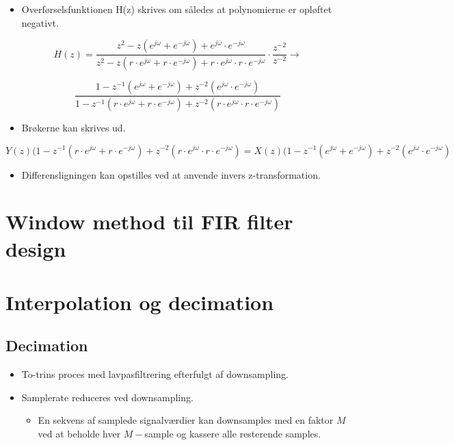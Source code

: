 \documentclass[danish]{article}
\begin{document}
\begin{itemize}
	\item Overførselsfunktionen H(z) skrives om således at polynomierne er opløftet negativt.
\end{itemize}

\begin{equation}
H(z) = \frac{z^2 - z(e^{j\omega}+e^{-j\omega}) + e^{j\omega}\cdot e^{-j\omega}}{z^2 - z(r\cdot e^{j\omega}+r\cdot e^{-j\omega}) + r\cdot e^{j\omega}\cdot r\cdot e^{-j\omega}} \cdot \frac{z^{-2}}{z^{-2}} \longrightarrow 
\end{equation}

\begin{equation}
\frac{1 - z^{-1}(e^{j\omega}+e^{-j\omega}) + z^{-2}(e^{j\omega}\cdot e^{-j\omega})}{1 - z^{-1}(r\cdot e^{j\omega}+r\cdot e^{-j\omega}) + z^{-2}(r\cdot e^{j\omega}\cdot r\cdot e^{-j\omega})}
\end{equation}

\begin{itemize}
	\item Brøkerne kan skrives ud.
\end{itemize}

\begin{equation}
Y(z)(1-z^{-1}(r\cdot e^{j\omega}+r\cdot e^{-j\omega})+z^{-2}(r\cdot e^{j\omega}\cdot r\cdot e^{-j\omega}) = X(z)(1-z^{-1}(e^{j\omega}+e^{-j\omega})+z^{-2}(e^{j\omega}\cdot e^{-j\omega})
\end{equation}

\begin{itemize}
	\item Differensligningen kan opstilles ved at anvende invers z-transformation.
\end{itemize}





\newpage
\section{Window method til FIR filter design}
\newpage
\section{Interpolation og decimation}
\subsection{Decimation}
\begin{itemize}
	\item To-trins proces med lavpasfiltrering efterfulgt af downsampling.
	\item Samplerate reduceres ved downsampling.
	\begin{itemize}
		\item En sekvens af samplede signalværdier kan downsamples med en faktor $M$ ved at beholde hver $M-$sample og kassere alle resterende samples.
	\end{itemize}
\end{itemize}
\end{document}
